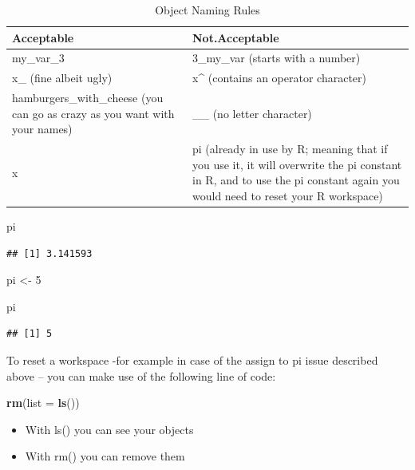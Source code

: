 \documentclass[
]{book}
\newenvironment{Shaded}{\begin{snugshade}}{\end{snugshade}}
\newcommand{\AttributeTok}[1]{\textcolor[rgb]{0.13,0.29,0.53}{#1}}
\newcommand{\DecValTok}[1]{\textcolor[rgb]{0.00,0.00,0.81}{#1}}
\newcommand{\FunctionTok}[1]{\textcolor[rgb]{0.13,0.29,0.53}{\textbf{#1}}}
\newcommand{\NormalTok}[1]{#1}
\newcommand{\OtherTok}[1]{\textcolor[rgb]{0.56,0.35,0.01}{#1}}
\begin{document}
\begin{table}

\caption{\label{tab:object-errors}Object Naming Rules}
\centering
\begin{tabular}[t]{ll}
\toprule
Acceptable & Not.Acceptable\\
\midrule
my\_var\_3 & 3\_my\_var (starts with a number)\\
x\_ (fine albeit ugly) & x\textasciicircum{} (contains an operator character)\\
hamburgers\_with\_cheese (you can go as crazy as you want with your names) & \_\_ (no letter character)\\
x & pi (already in use by R; meaning that if you use it, it will overwrite the pi constant in R, and to use the pi constant again you would need to reset your R workspace)\\
\bottomrule
\end{tabular}
\end{table}

\begin{Shaded}
\begin{Highlighting}[]
\NormalTok{pi}
\end{Highlighting}
\end{Shaded}

\begin{verbatim}
## [1] 3.141593
\end{verbatim}

\begin{Shaded}
\begin{Highlighting}[]
\NormalTok{pi }\OtherTok{\textless{}{-}} \DecValTok{5}

\NormalTok{pi}
\end{Highlighting}
\end{Shaded}

\begin{verbatim}
## [1] 5
\end{verbatim}

To reset a workspace -for example in case of the assign to pi issue described above -- you can make use of the following line of code:

\begin{Shaded}
\begin{Highlighting}[]
\FunctionTok{rm}\NormalTok{(}\AttributeTok{list =} \FunctionTok{ls}\NormalTok{())}
\end{Highlighting}
\end{Shaded}

\begin{itemize}
\item
  With ls() you can see your objects
\item
  With rm() you can remove them
\end{itemize}
\end{document}
